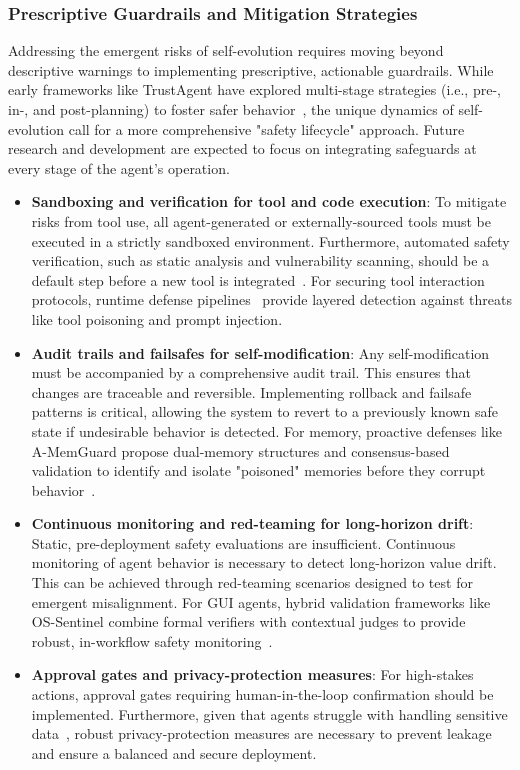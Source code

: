 \documentclass[10pt]{article} %
\begin{document}
\subsubsection{Prescriptive Guardrails and Mitigation Strategies}

Addressing the emergent risks of self-evolution requires moving beyond descriptive warnings to implementing prescriptive, actionable guardrails. While early frameworks like TrustAgent have explored multi-stage strategies (i.e., pre-, in-, and post-planning) to foster safer behavior~\citep{hua2024trustagent}, the unique dynamics of self-evolution call for a more comprehensive "safety lifecycle" approach. Future research and development are expected to focus on integrating safeguards at every stage of the agent's operation.

\begin{itemize}
\item \textbf{Sandboxing and verification for tool and code execution}: To mitigate risks from tool use, all agent-generated or externally-sourced tools must be executed in a strictly sandboxed environment. Furthermore, automated safety verification, such as static analysis and vulnerability scanning, should be a default step before a new tool is integrated~\citep{mcpscan}. For securing tool interaction protocols, runtime defense pipelines~\citep{xing2025mcp, wang2025mcpguard} provide layered detection against threats like tool poisoning and prompt injection.
\item \textbf{Audit trails and failsafes for self-modification}: Any self-modification must be accompanied by a comprehensive audit trail. This ensures that changes are traceable and reversible. Implementing rollback and failsafe patterns is critical, allowing the system to revert to a previously known safe state if undesirable behavior is detected. For memory, proactive defenses like A-MemGuard propose dual-memory structures and consensus-based validation to identify and isolate "poisoned" memories before they corrupt behavior~\citep{wang2025unveiling, wei2025memguard}.
\item \textbf{Continuous monitoring and red-teaming for long-horizon drift}: Static, pre-deployment safety evaluations are insufficient. Continuous monitoring of agent behavior is necessary to detect long-horizon value drift. This can be achieved through red-teaming scenarios designed to test for emergent misalignment. For GUI agents, hybrid validation frameworks like OS-Sentinel combine formal verifiers with contextual judges to provide robust, in-workflow safety monitoring~\citep{sun2025sentinel}.
\item \textbf{Approval gates and privacy-protection measures}: For high-stakes actions, approval gates requiring human-in-the-loop confirmation should be implemented. Furthermore, given that agents struggle with handling sensitive data~\citep{zharmagambetov2025agentdam}, robust privacy-protection measures are necessary to prevent leakage and ensure a balanced and secure deployment.
\end{itemize}
\end{document}
